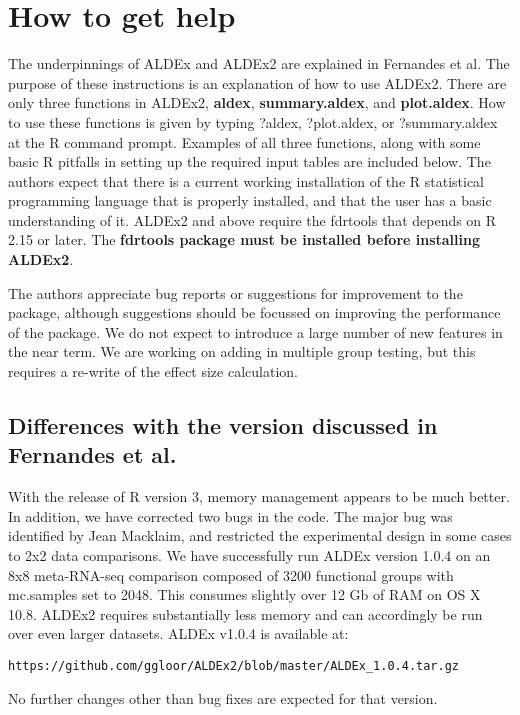 \documentclass[11pt]{amsart}
\begin{document}
\section{How to get help}
The underpinnings of ALDEx and ALDEx2 are explained in Fernandes et al\cite{fernandes:2013}. The purpose of these instructions is an explanation of how to use ALDEx2. There are only three functions in ALDEx2, {\bf aldex}, {\bf summary.aldex}, and {\bf plot.aldex}. How to use these functions is given by typing ?aldex, ?plot.aldex, or ?summary.aldex at the R command prompt. Examples of all three functions, along with some basic R pitfalls in setting up the required input tables are included below. The authors expect that there is a current working installation of the R statistical programming language that is properly installed, and that the user has a basic understanding of it. ALDEx2 and above require the fdrtools that depends on R 2.15 or later. The \textbf{fdrtools package must be installed before installing ALDEx2}.

The authors appreciate bug reports or suggestions for improvement to the package, although suggestions should be focussed on improving the performance of the package. We do not expect to introduce a large number of new features in the near term. We are working on adding in multiple group testing, but this requires a re-write of the effect size calculation.

\subsection{Differences with the version discussed in Fernandes et al.\cite{fernandes:2013}}  With the release of R version 3, memory management appears to be much better. In addition, we have corrected two bugs in the code. The major bug was identified by Jean Macklaim, and restricted the experimental design in some cases to 2x2 data comparisons. We have successfully run ALDEx version 1.0.4 on an 8x8 meta-RNA-seq comparison composed of 3200 functional groups with mc.samples set to 2048. This consumes slightly over 12 Gb of RAM on OS X 10.8. ALDEx2  requires substantially less memory and can accordingly be run over even larger datasets. ALDEx v1.0.4 is available at: \begin{verbatim}https://github.com/ggloor/ALDEx2/blob/master/ALDEx_1.0.4.tar.gz\end{verbatim} No further changes other than bug fixes are expected for that version. 
\end{document}
